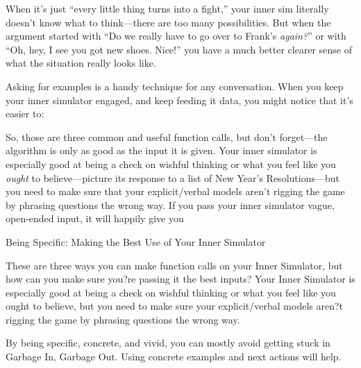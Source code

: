 When it's just ``every little thing turns into a fight,'' your inner sim literally doesn't know what to think---there are too many possibilities.  But when the argument started with ``Do we really have to go over to Frank's \emph{again?}'' or with ``Oh, hey, I see you got new shoes.  Nice!'' you have a much better clearer sense of what the situation really looks like.

Asking for examples is a handy technique for any conversation.  When you keep your inner simulator engaged, and keep feeding it data, you might notice that it's easier to:


So, those are three common and useful function calls, but don't forget---the algorithm is only as good as the input it is given.  Your inner simulator is especially good at being a check on wishful thinking or what you feel like you \emph{ought} to believe---picture its response to a list of New Year's Resolutions---but you need to make sure that your explicit/verbal models aren't rigging the game by phrasing questions the wrong way.  If you pass your inner simulator vague, open-ended input, it will happily give you 
























Being Specific: Making the Best Use of Your Inner Simulator 

These are three ways you can make function calls on your Inner Simulator, but how can you make sure you?re passing it the best inputs?  Your Inner Simulator is especially good at being a check on wishful thinking or what you feel like you ought to believe, but you need to make sure your explicit/verbal models aren?t rigging the game by phrasing questions the wrong way.  

By being specific, concrete, and vivid, you can mostly avoid getting stuck in Garbage In, Garbage Out.  Using concrete examples and next actions will help.

